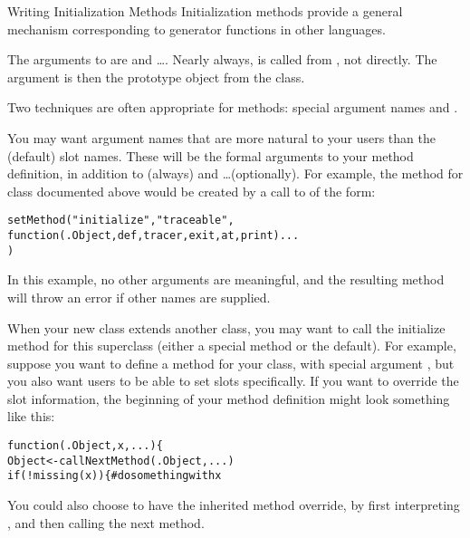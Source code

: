 \begin{Section}{Writing Initialization Methods}
Initialization methods provide a general mechanism corresponding to
generator functions in other languages.

The arguments to  are  and
\dots. Nearly always,  is called from ,
not directly.  The  argument is then the
prototype object from the class.

Two techniques are often appropriate for  methods:
special argument names and .

You may want argument names that are more natural to your users than
the (default) slot names.  These will be the formal arguments to
your method definition, in addition to  (always) and
\dots (optionally).  For example, the method for class
 documented above would be created by a call to
 of the form:

\begin{alltt}    setMethod("initialize", "traceable",
      function(.Object, def, tracer, exit, at, print) ...
    )
\end{alltt}


In this example, no other arguments are meaningful, and the resulting
method will throw an error if other names are supplied.

When your new class extends another class, you may want to call the
initialize method for this superclass (either a special method or the
default).  For example, suppose you want to define a method for your
class, with special argument , but you also want users to be
able to set slots specifically.  If you want  to override the
slot information, the beginning of your method definition might look
something like this:

\begin{alltt}    function(.Object, x, ...) \{
      Object <- callNextMethod(.Object, ...)
      if(!missing(x)) \{ # do something with x
\end{alltt}


You could also choose to have the inherited method override, by first
interpreting , and then calling the next method.

\end{Section}

